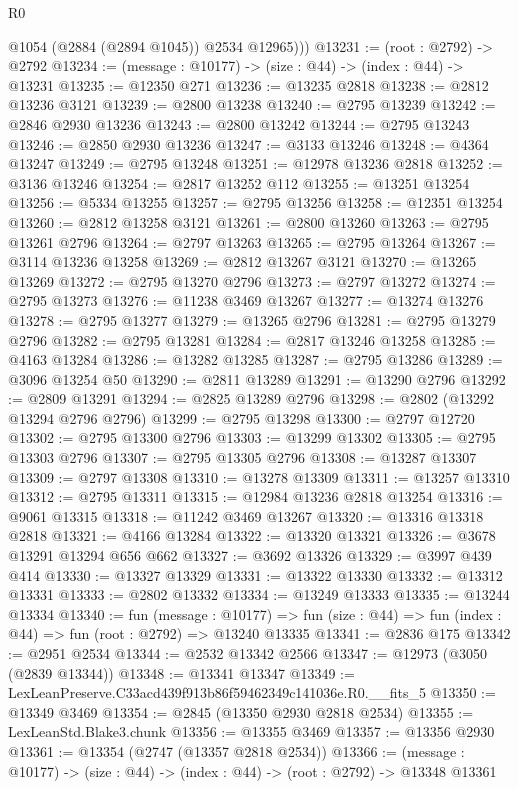 \begin{lexlean}{R0}
\begin{coremodule}
          @1054
          (@2884 (@2894 @1045))
          @2534
          @12965)))
@13231 := (root : @2792) -> @2792
@13234 := (message : @10177) -> (size : @44) -> (index : @44) -> @13231
@13235 := @12350 @271
@13236 := @13235 @2818
@13238 := @2812 @13236 @3121
@13239 := @2800 @13238
@13240 := @2795 @13239
@13242 := @2846 @2930 @13236
@13243 := @2800 @13242
@13244 := @2795 @13243
@13246 := @2850 @2930 @13236
@13247 := @3133 @13246
@13248 := @4364 @13247
@13249 := @2795 @13248
@13251 := @12978 @13236 @2818
@13252 := @3136 @13246
@13254 := @2817 @13252 @112
@13255 := @13251 @13254
@13256 := @5334 @13255
@13257 := @2795 @13256
@13258 := @12351 @13254
@13260 := @2812 @13258 @3121
@13261 := @2800 @13260
@13263 := @2795 @13261 @2796
@13264 := @2797 @13263
@13265 := @2795 @13264
@13267 := @3114 @13236 @13258
@13269 := @2812 @13267 @3121
@13270 := @13265 @13269
@13272 := @2795 @13270 @2796
@13273 := @2797 @13272
@13274 := @2795 @13273
@13276 := @11238 @3469 @13267
@13277 := @13274 @13276
@13278 := @2795 @13277
@13279 := @13265 @2796
@13281 := @2795 @13279 @2796
@13282 := @2795 @13281
@13284 := @2817 @13246 @13258
@13285 := @4163 @13284
@13286 := @13282 @13285
@13287 := @2795 @13286
@13289 := @3096 @13254 @50
@13290 := @2811 @13289
@13291 := @13290 @2796
@13292 := @2809 @13291
@13294 := @2825 @13289 @2796
@13298 := @2802 (@13292 @13294 @2796 @2796)
@13299 := @2795 @13298
@13300 := @2797 @12720
@13302 := @2795 @13300 @2796
@13303 := @13299 @13302
@13305 := @2795 @13303 @2796
@13307 := @2795 @13305 @2796
@13308 := @13287 @13307
@13309 := @2797 @13308
@13310 := @13278 @13309
@13311 := @13257 @13310
@13312 := @2795 @13311
@13315 := @12984 @13236 @2818 @13254
@13316 := @9061 @13315
@13318 := @11242 @3469 @13267
@13320 := @13316 @13318 @2818
@13321 := @4166 @13284
@13322 := @13320 @13321
@13326 := @3678 @13291 @13294 @656 @662
@13327 := @3692 @13326
@13329 := @3997 @439 @414
@13330 := @13327 @13329
@13331 := @13322 @13330
@13332 := @13312 @13331
@13333 := @2802 @13332
@13334 := @13249 @13333
@13335 := @13244 @13334
@13340 := fun (message : @10177) =>
  fun (size : @44) => fun (index : @44) => fun (root : @2792) => @13240 @13335
@13341 := @2836 @175
@13342 := @2951 @2534
@13344 := @2532 @13342 @2566
@13347 := @12973 (@3050 (@2839 @13344))
@13348 := @13341 @13347
@13349 := LexLeanPreserve.C33acd439f913b86f59462349c141036e.R0.__fits_5
@13350 := @13349 @3469
@13354 := @2845 (@13350 @2930 @2818 @2534)
@13355 := LexLeanStd.Blake3.chunk
@13356 := @13355 @3469
@13357 := @13356 @2930
@13361 := @13354 (@2747 (@13357 @2818 @2534))
@13366 := (message : @10177) -> (size : @44) -> (index : @44) -> (root : @2792) -> @13348 @13361

\end{coremodule}
\end{lexlean}
